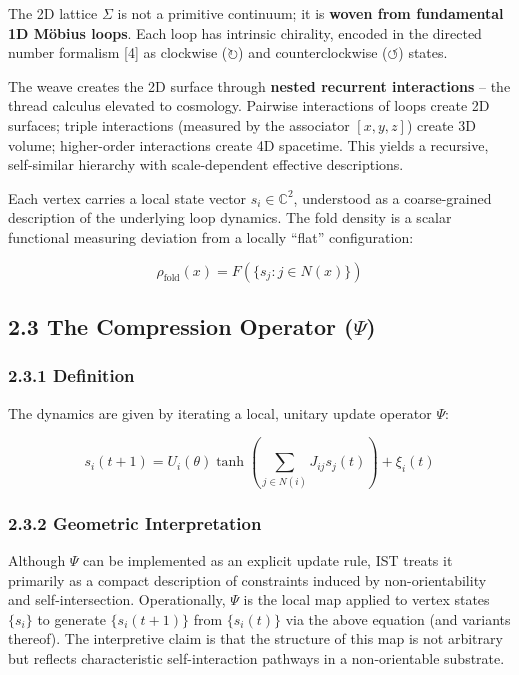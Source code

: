 \documentclass[
  11pt,
]{article}
\begin{document}
The 2D lattice \(\Sigma\) is not a primitive continuum; it is
\textbf{woven from fundamental 1D Möbius loops}. Each loop has intrinsic
chirality, encoded in the directed number formalism {[}4{]} as clockwise
(\(\circlearrowright\)) and counterclockwise (\(\circlearrowleft\))
states.

The weave creates the 2D surface through \textbf{nested recurrent
interactions} -- the thread calculus elevated to cosmology. Pairwise
interactions of loops create 2D surfaces; triple interactions (measured
by the associator \([x, y, z]\)) create 3D volume; higher-order
interactions create 4D spacetime. This yields a recursive, self-similar
hierarchy with scale-dependent effective descriptions.

Each vertex carries a local state vector \(s_i \in \mathbb{C}^2\),
understood as a coarse-grained description of the underlying loop
dynamics. The fold density is a scalar functional measuring deviation
from a locally ``flat'' configuration:

\[\rho_{\text{fold}}(x) = F(\{s_j : j \in N(x)\})\]

\subsection{\texorpdfstring{2.3 The Compression Operator
(\(\Psi\))}{2.3 The Compression Operator (\textbackslash Psi)}}\label{the-compression-operator-psi}

\subsubsection{2.3.1 Definition}\label{definition}

The dynamics are given by iterating a local, unitary update operator
\(\Psi\):

\[s_i(t+1) = U_i(\theta) \tanh\left(\sum_{j \in N(i)} J_{ij} s_j(t)\right) + \xi_i(t)\]

\subsubsection{2.3.2 Geometric
Interpretation}\label{geometric-interpretation}

Although \(\Psi\) can be implemented as an explicit update rule, IST
treats it primarily as a compact description of constraints induced by
non-orientability and self-intersection. Operationally, \(\Psi\) is the
local map applied to vertex states \(\{s_i\}\) to generate
\(\{s_i(t+1)\}\) from \(\{s_i(t)\}\) via the above equation (and
variants thereof). The interpretive claim is that the structure of this
map is not arbitrary but reflects characteristic self-interaction
pathways in a non-orientable substrate.
\end{document}
